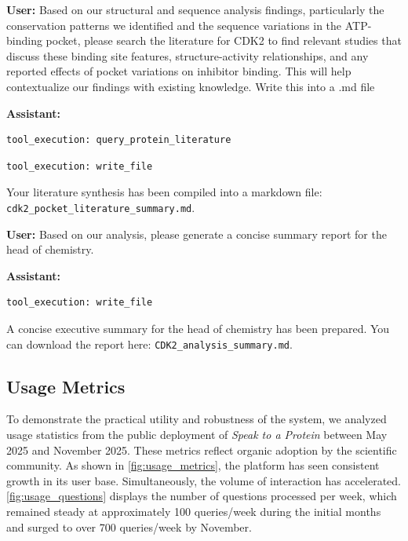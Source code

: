 \documentclass{article}
\begin{document}
\vspace{1.5em}

\begin{userbox}
\textbf{User:} Based on our structural and sequence analysis findings, particularly the conservation patterns we identified and the sequence variations in the ATP-binding pocket, please search the literature for CDK2 to find relevant studies that discuss these binding site features, structure-activity relationships, and any reported effects of pocket variations on inhibitor binding. This will help contextualize our findings with existing knowledge.
Write this into a .md file
\end{userbox}
\vspace{1.5em}

\begin{assistantbox}
\textbf{Assistant:}
\begin{verbatim}
tool_execution: query_protein_literature
\end{verbatim}

\begin{verbatim}
tool_execution: write_file
\end{verbatim}
Your literature synthesis has been compiled into a markdown file: \texttt{cdk2\_pocket\_literature\_summary.md}.
\end{assistantbox}

\vspace{1.5em}

\begin{userbox}
\textbf{User:} Based on our analysis, please generate a concise summary report for the head of chemistry.
\end{userbox}

\begin{assistantbox}
\textbf{Assistant:}
\begin{verbatim}
tool_execution: write_file
\end{verbatim}
A concise executive summary for the head of chemistry has been prepared. You can download the report here: \texttt{CDK2\_analysis\_summary.md}.
\end{assistantbox}

\clearpage
\subsection{Usage Metrics} \label{sec:appendix_usage}

To demonstrate the practical utility and robustness of the system, we analyzed usage statistics from the public deployment of \emph{Speak to a Protein} between May 2025 and November 2025. These metrics reflect organic adoption by the scientific community. As shown in \cref{fig:usage_metrics}, the platform has seen consistent growth in its user base.  Simultaneously, the volume of interaction has accelerated. \cref{fig:usage_questions} displays the number of questions processed per week, which remained steady at approximately 100 queries/week during the initial months and surged to over 700 queries/week by November.
\end{document}
